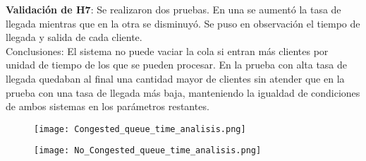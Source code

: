 \documentclass[12pt,a4paper]{article}
\begin{document}
\textbf{Validación de H7}: Se realizaron dos pruebas. En una se aumentó la tasa de llegada mientras que en la otra se disminuyó. Se puso en observación el tiempo de llegada y salida de cada cliente.\\
Conclusiones: El sistema no puede vaciar la cola si entran más clientes por unidad de tiempo de los que se pueden procesar.
En la prueba con alta tasa de llegada quedaban al final una cantidad mayor de clientes sin atender que en la prueba con una
tasa de llegada más baja, manteniendo la igualdad de condiciones de ambos sistemas en los parámetros restantes.\\
\newpage
\begin{figure}[!h]
    \centering
    \texttt{[image: Congested\_queue\_time\_analisis.png]}
\end{figure}
\begin{figure}[!h]
    \centering
    \texttt{[image: No\_Congested\_queue\_time\_analisis.png]}
\end{figure}

\newpage
\newpage
\end{document}

